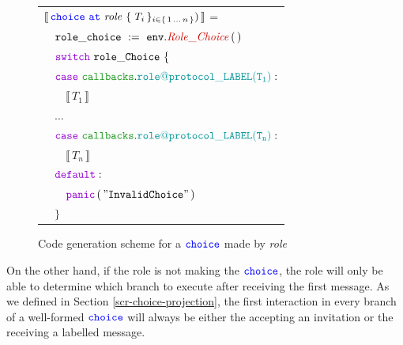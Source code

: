 \documentclass[12pt,twoside]{report}
\begin{document}
\begin{figure}[!h]
    \begin{center}
        \begin{tabular}{l}
            $\llbracket\,{\color{blue}\mathtt{choice}}\ {\color{blue}\mathtt{at}}\ \mathit{role}\ \{\,\mathit{T}_{i}\,\}_{{i \in \{\,1\,\dots\,n\,\}}})\,\rrbracket$ =\\[10pt]
            
            $\quad \assignment{role\_choice}{\methodcall{\envparam}{Role\_Choice}\,\emptyparams}$\\[3pt]
            
            $\quad \goswitch\ \varname{role\_Choice}\ \{$\\[3pt]

            $\quad \gocase\ \pkgenumaccess{callbacks}{\localprotocol{role}{protocol}\_LABEL(T_1)}:$\\[3pt]

            $\qquad \llbracket\,T_1\,\rrbracket$\\[6pt]

            $\quad \dots$\\[9pt]
            
            $\quad \gocase\ \pkgenumaccess{callbacks}{\localprotocol{role}{protocol}\_LABEL(T_n)}:$\\[3pt]

            $\qquad \llbracket\,T_n\,\rrbracket$\\[6pt]

            $\quad \godefault:$\\[3pt]

            $\qquad \gopanic\,(\,\mathtt{"Invalid Choice"}\,)$\\[3pt]

            $\quad \}$\\
        \end{tabular}
    \end{center}
    \caption{Code generation scheme for a ${\color{blue}\mathtt{choice}}$ made by \textit{role}}
    \label{role-makes-choice-codegen}
\end{figure}

On the other hand, if the role is not making the ${\color{blue}\mathtt{choice}}$, the role will only be able to determine which branch to execute after receiving the first message. As we defined in Section \ref{scr-choice-projection}, the first interaction in every branch of a well-formed ${\color{blue}\mathtt{choice}}$ will always be either the accepting an invitation or the receiving a labelled message.\\
\end{document}
